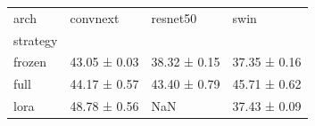 \begin{tabular}{llll}
\toprule
arch & convnext & resnet50 & swin \\
strategy &  &  &  \\
\midrule
frozen & 43.05 ± 0.03 & 38.32 ± 0.15 & 37.35 ± 0.16 \\
full & 44.17 ± 0.57 & 43.40 ± 0.79 & 45.71 ± 0.62 \\
lora & 48.78 ± 0.56 & NaN & 37.43 ± 0.09 \\
\bottomrule
\end{tabular}
